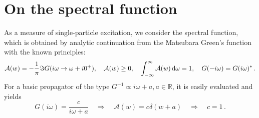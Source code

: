 \documentclass[11pt]{article}
\begin{document}
\section{On the spectral function}

As a measure of single-particle excitation, we consider the spectral function, which is obtained by analytic continuation from the Matsubara Green's function with the known principles:
%
\begin{equation}
	\mathcal{A}(w) = -\frac{1}{\pi} \Im{G(i\omega \rightarrow \omega + i0^+)},
\quad
\mathcal{A}(w) \geq 0,
\quad
\int_{-\infty}^{\infty} \mathcal{A}(w) \dif \omega = 1,
\quad
G(-i\omega) = G(i\omega)^*
\, .
\end{equation}
%
For a basic propagator of the type $G^{-1} \propto i\omega + a, a \in \mathbb{R}$, it is easily evaluated and yields
%
 \begin{equation}
 G(i\omega) = \frac{c}{i\omega+a} 
 \quad
 \Rightarrow
 \quad
\mathcal{A}(w) = c \delta(w+a)
\quad
\Rightarrow
\quad
c = 1 
\, .
 \end{equation}
















\end{document}
